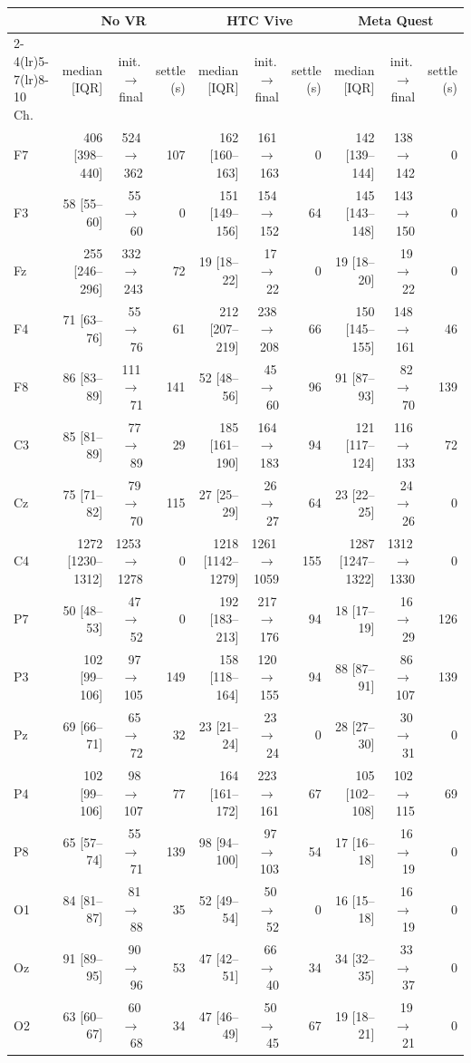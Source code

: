 \begin{tabular}{lrrrrrrrrr}
\toprule
 & \multicolumn{3}{c}{No VR} & \multicolumn{3}{c}{HTC Vive} & \multicolumn{3}{c}{Meta Quest} \\
\cmidrule(lr){2-4}\cmidrule(lr){5-7}\cmidrule(lr){8-10}
Ch. & median [IQR] & init.\,$\to$\,final & settle (s) & median [IQR] & init.\,$\to$\,final & settle (s) & median [IQR] & init.\,$\to$\,final & settle (s) \\
\midrule
F7 & 406 [398--440] & 524\,$\to$\,362 & 107 & 162 [160--163] & 161\,$\to$\,163 & 0 & 142 [139--144] & 138\,$\to$\,142 & 0 \\
F3 & 58 [55--60] & 55\,$\to$\,60 & 0 & 151 [149--156] & 154\,$\to$\,152 & 64 & 145 [143--148] & 143\,$\to$\,150 & 0 \\
Fz & 255 [246--296] & 332\,$\to$\,243 & 72 & 19 [18--22] & 17\,$\to$\,22 & 0 & 19 [18--20] & 19\,$\to$\,22 & 0 \\
F4 & 71 [63--76] & 55\,$\to$\,76 & 61 & 212 [207--219] & 238\,$\to$\,208 & 66 & 150 [145--155] & 148\,$\to$\,161 & 46 \\
F8 & 86 [83--89] & 111\,$\to$\,71 & 141 & 52 [48--56] & 45\,$\to$\,60 & 96 & 91 [87--93] & 82\,$\to$\,70 & 139 \\
C3 & 85 [81--89] & 77\,$\to$\,89 & 29 & 185 [161--190] & 164\,$\to$\,183 & 94 & 121 [117--124] & 116\,$\to$\,133 & 72 \\
Cz & 75 [71--82] & 79\,$\to$\,70 & 115 & 27 [25--29] & 26\,$\to$\,27 & 64 & 23 [22--25] & 24\,$\to$\,26 & 0 \\
C4 & 1272 [1230--1312] & 1253\,$\to$\,1278 & 0 & 1218 [1142--1279] & 1261\,$\to$\,1059 & 155 & 1287 [1247--1322] & 1312\,$\to$\,1330 & 0 \\
P7 & 50 [48--53] & 47\,$\to$\,52 & 0 & 192 [183--213] & 217\,$\to$\,176 & 94 & 18 [17--19] & 16\,$\to$\,29 & 126 \\
P3 & 102 [99--106] & 97\,$\to$\,105 & 149 & 158 [118--164] & 120\,$\to$\,155 & 94 & 88 [87--91] & 86\,$\to$\,107 & 139 \\
Pz & 69 [66--71] & 65\,$\to$\,72 & 32 & 23 [21--24] & 23\,$\to$\,24 & 0 & 28 [27--30] & 30\,$\to$\,31 & 0 \\
P4 & 102 [99--106] & 98\,$\to$\,107 & 77 & 164 [161--172] & 223\,$\to$\,161 & 67 & 105 [102--108] & 102\,$\to$\,115 & 69 \\
P8 & 65 [57--74] & 55\,$\to$\,71 & 139 & 98 [94--100] & 97\,$\to$\,103 & 54 & 17 [16--18] & 16\,$\to$\,19 & 0 \\
O1 & 84 [81--87] & 81\,$\to$\,88 & 35 & 52 [49--54] & 50\,$\to$\,52 & 0 & 16 [15--18] & 16\,$\to$\,19 & 0 \\
Oz & 91 [89--95] & 90\,$\to$\,96 & 53 & 47 [42--51] & 66\,$\to$\,40 & 34 & 34 [32--35] & 33\,$\to$\,37 & 0 \\
O2 & 63 [60--67] & 60\,$\to$\,68 & 34 & 47 [46--49] & 50\,$\to$\,45 & 67 & 19 [18--21] & 19\,$\to$\,21 & 0 \\
\bottomrule
\end{tabular}

